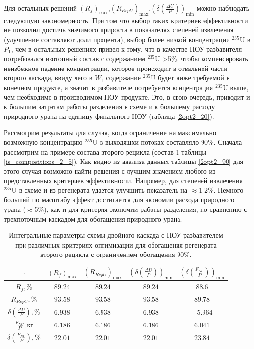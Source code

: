 Для остальных решений $(R_{f})_\text{max}$,$(R_{RepU})_\text{max}$,$(\delta(\frac{\Delta U}{P}))_\text{min}$ можно наблюдать следующую закономерность. При том что выбор таких критериев эффективности не позволил достичь значимого прироста в показателях степеней извлечения (улучшение составляют доли процента), выбор более низкой концентрации $^{235}$U в $P_{1}$, чем в остальных решениях привел к тому, что в качестве НОУ-разбавителя потребовался изотопный состав с содержанием $^{235}$U >5\%, чтобы компенсировать неизбежное падение концентрации, которое происходит в отвальной части второго каскада, ввиду чего в $W_{1}$ содержание $^{235}$U будет ниже требуемой в конечном продукте, а значит в разбавителе потребуется концентрация $^{235}$U выше, чем необходимо в производимом НОУ-продукте. Это, в свою очередь, приводит и к большим затратам работы разделения в схеме и к большему расходу природного урана на единицу финального НОУ (таблица \ref{2opt2_20}). 




Рассмотрим результаты для случая, когда ограничение на максимально возможную концентрацию $^{235}$U в выходящхи потоках составляло 90\%. Сначала рассмотрим на примере состава второго рецикла (состав 1 таблицы \ref{is_compositions_2_5}). Как видно из анализа данных таблицы \ref{2opt2_90} для этого случая возможно найти решения с лучшим значением любого из представленных критериев эффективности. Например, для степеней извлечения $^{235}$U в схеме и из регенерата удается улучшить показатель на $\approx$1-2\%. Немного больший по масштабу эффект достигается для экономии расхода природного урана ($\approx$5\%), как и для критерия экономии работы разделения, по сравнению с трехпоточным каскадом для обогащения природного урана.

\begin{table}
    \centering
    \begin{tabular}{|c|cccc|}
        \hline $\cdot$ & $(R_f)_\text{max}$ & $(R_{RepU})_\text{max}$ & $(\delta(\frac{\Delta U}{P}))_\text{min}$ & $(\delta(\frac{F_{NU}}{P}))_\text{min}$\\ \hline
        $R_f, \%$ & $89.24$ & $89.24$ & $89.24$ & $88.6$\\ \hline
        $R_{RepU}, \%$ & $93.58$ & $93.58$ & $93.58$ & $89.78$\\ \hline
        $\delta(\frac{\Delta U}{P}), \%$ & $6.938$ & $6.938$ & $6.938$ & $-5.964$\\ \hline
        $\frac{F_{NU}}{P}, \text{кг}$ & $6.186$ & $6.186$ & $6.186$ & $6.041$\\ \hline
        $\delta(\frac{F_{NU}}{P}), \%$ & $22.01$ & $22.01$ & $22.01$ & $23.84$\\ \hline
    \end{tabular}
    \caption{Интегральные параметры схемы двойного каскада с НОУ-разбавителем при различных критериях оптимизации для обогащения регенерата второго рецикла с ограничением обогащения 90\%.{\label{2opt2_90_int}}}
\end{table}

